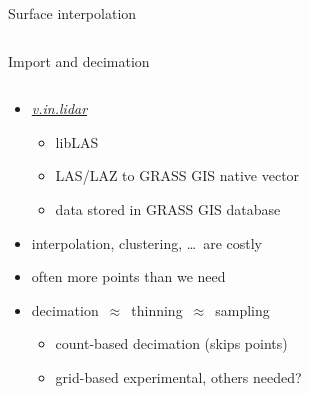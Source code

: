 \documentclass[xcolor={dvipsnames,usenames},beamer,aspectratio=169]{beamer}
\newcommand{\gmodule}[1]{\href{http://grass.osgeo.org/grass71/manuals/#1.html}{\emph{#1}}}
\begin{document}
\begin{frame}{Surface interpolation}
\begin{columns}
\begin{column}{0.4\textwidth}
\end{column}
\end{columns}

\end{frame}


\begin{frame}{Import and decimation}

\begin{columns}
\begin{column}{0.58\textwidth}

\begin{itemize}
  \item \gmodule{v.in.lidar}
  \begin{itemize}
   \item libLAS
   \item LAS/LAZ to GRASS GIS native vector
    \item data stored in GRASS GIS database
  \end{itemize}
  \item interpolation, clustering, \ldots\ are costly
  \item often more points than we need
  \item decimation~$\approx$~thinning~$\approx$~sampling
  \begin{itemize}
    \item count-based decimation (skips points)
    \item grid-based experimental, others needed?
  \end{itemize}
\end{itemize}

\end{column}
\begin{column}{0.22\textwidth}



\end{column}
\end{columns}
\end{frame}
\end{document}
